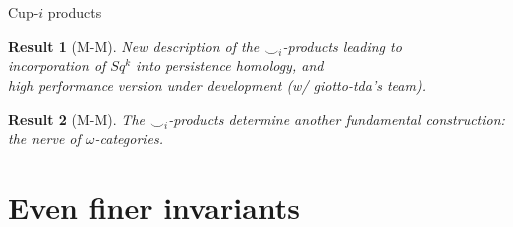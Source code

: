 \documentclass[10pt,t, handout]{beamer} %
\newtheorem{result}{Result}
\begin{document}
\begin{frame}[c]{Cup-$i$ products}
	\pause
	\vskip 10pt
	
	\begin{result}[M-M]
		New description of the $\smallsmile_i$-products leading to \\
		incorporation of $Sq^k$ into persistence homology, and \\
		high performance version under development (w/ giotto-tda's team).
	\end{result}
	
	\pause
	\vskip 10pt
	
	\begin{result}[M-M]
		The $\smallsmile_i$-products determine another fundamental construction: the nerve of $\omega$-categories.
	\end{result}
\end{frame}

\section{Even finer invariants}
\end{document}
